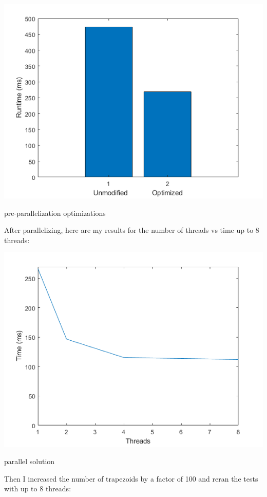\documentclass[a4paper]{article}
\begin{document}
\begin{center}
    \includegraphics[scale=1]{11a.png}
    \caption{pre-parallelization optimizations}
\end{center}

\noindent
After parallelizing, here are my results for the number of threads vs time up to 8 threads:

\begin{center}
    \includegraphics[scale=1]{11b.png}
    \caption{parallel solution}
\end{center}

Then I increased the number of trapezoids by a factor of 100 and reran the tests with up to 8 threads:
\end{document}
